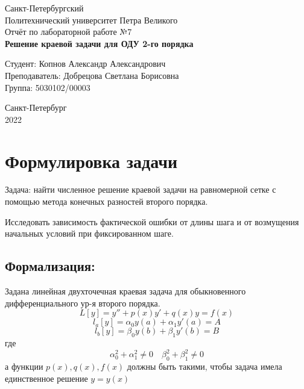 \documentclass[a4paper]{article}
\begin{document}
\begin{titlepage}
  \Large
  \begin{center}
    Санкт-Петербургский\\
    Политехнический университет Петра Великого\\
    \vspace{10em}
    Отчёт по лабораторной работе №7\\
    \vspace{2em}
    \textbf{Решение краевой задачи для ОДУ 2-го порядка}
  \end{center}
  \vspace{6em}
  \begin{flushright}
    Студент: Копнов Александр Александрович\\
    Преподаватель: Добрецова Светлана Борисовна\\
    Группа: 5030102/00003
  \end{flushright}
  \vspace{\fill}
  \begin{center}
    Санкт-Петербург\\
    2022
  \end{center}
\end{titlepage}
\pagebreak

\section{Формулировка задачи}\label{sec:S1}
Задача: найти численное решение краевой задачи на равномерной сетке с помощью метода конечных разностей второго порядка.

Исследовать зависимость фактической ошибки от длины шага и от возмущения начальных условий при фиксированном шаге.

\subsection{Формализация:}\label{subsec:SS1}
Задана линейная двухточечная краевая задача для обыкновенного дифференциального ур-я второго порядка.
\begin{equation}
\label{eq:1}
  L[y] = y'' + p(x)y' + q(x)y = f(x)
\end{equation}
\[
  l_{a}[y] = \alpha_{0}y(a) + \alpha_{1}y'(a) = A
\]
\[
  l_{b}[y] = \beta_{0}y(b) + \beta_{1}y'(b) = B
\]
где
\[
  \alpha_{0}^{2}+\alpha_{1}^{2} \neq 0 \quad
  \beta_{0}^{2}+\beta_{1}^{2} \neq 0
\]
а функции \(p(x),q(x),f(x)\) должны быть такими, чтобы задача имела единственное решение \(y=y(x)\)
\end{document}
